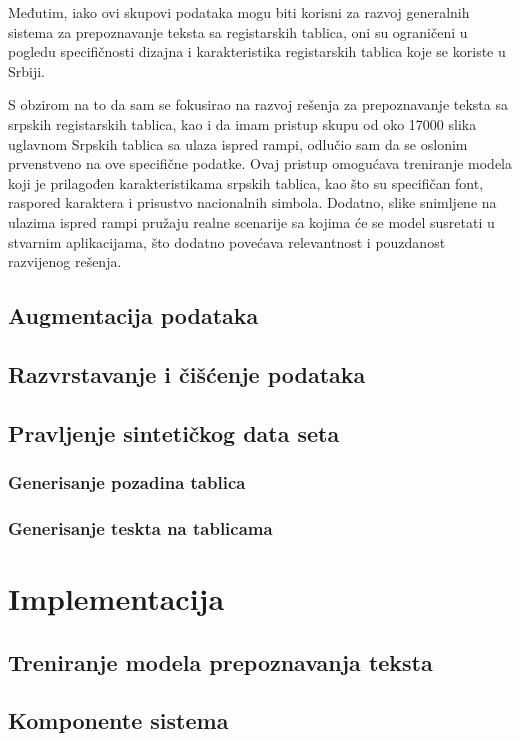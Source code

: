 \documentclass[a4paper,12pt]{article}
\begin{document}
	Međutim, iako ovi skupovi podataka mogu biti korisni za razvoj generalnih sistema za prepoznavanje teksta sa registarskih tablica, oni su ograničeni u pogledu specifičnosti dizajna i karakteristika registarskih tablica koje se koriste u Srbiji.
	
	S obzirom na to da sam se fokusirao na razvoj rešenja za prepoznavanje teksta sa srpskih registarskih tablica, kao i da imam pristup skupu od oko 17000 slika uglavnom Srpskih tablica sa ulaza ispred rampi, odlučio sam da se oslonim prvenstveno na ove specifične podatke. Ovaj pristup omogućava treniranje modela koji je prilagođen karakteristikama srpskih tablica, kao što su specifičan font, raspored karaktera i prisustvo nacionalnih simbola. Dodatno, slike snimljene na ulazima ispred rampi pružaju realne scenarije sa kojima će se model susretati u stvarnim aplikacijama, što dodatno povećava relevantnost i pouzdanost razvijenog rešenja.
	
	\subsection{Augmentacija podataka}
	\subsection{Razvrstavanje i čišćenje podataka}
	\subsection{Pravljenje sintetičkog data seta}
	\subsubsection{Generisanje pozadina tablica}
	\subsubsection{Generisanje teskta na tablicama}
	\newpage
	
	\section{Implementacija}
	\subsection{Treniranje modela prepoznavanja teksta}
	\subsection{Komponente sistema}
\end{document}

